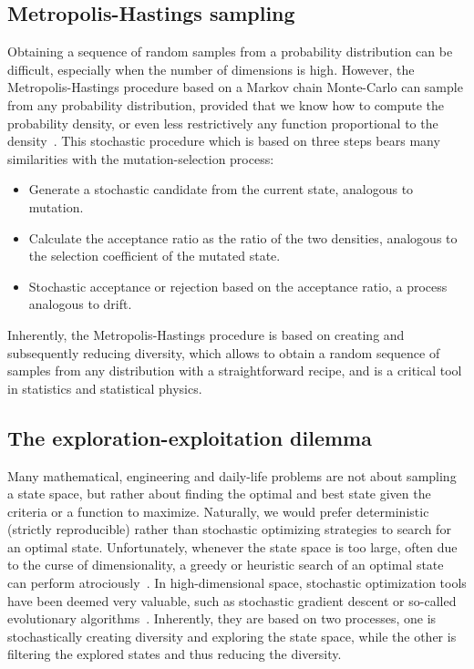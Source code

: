 \subsection{Metropolis-Hastings sampling}
Obtaining a sequence of random samples from a probability distribution can be difficult, especially when the number of dimensions is high.
However, the Metropolis-Hastings procedure based on a Markov chain Monte-Carlo can sample from any probability distribution, provided that we know how to compute the probability density, or even less restrictively any function proportional to the density~\citep{Hastings1970}.
This stochastic procedure which is based on three steps bears many similarities with the mutation-selection process:
\begin{itemize}
    \item Generate a stochastic candidate from the current state, analogous to mutation.
    \item Calculate the acceptance ratio as the ratio of the two densities, analogous to the selection coefficient of the mutated state.
    \item Stochastic acceptance or rejection based on the acceptance ratio, a process analogous to drift.
\end{itemize}
Inherently, the Metropolis-Hastings procedure is based on creating and subsequently reducing diversity, which allows to obtain a random sequence of samples from any distribution with a straightforward recipe, and is a critical
tool in statistics and statistical physics.

\subsection{The exploration-exploitation dilemma}
Many mathematical, engineering and daily-life problems are not about sampling a state space, but rather about finding the optimal and best state given the criteria or a function to maximize.
Naturally, we would prefer deterministic (strictly reproducible) rather than stochastic optimizing strategies to search for an optimal state.
Unfortunately, whenever the state space is too large, often due to the curse of dimensionality, a greedy or heuristic search of an optimal state can perform atrociously~\citep{Bellman1966}.
In high-dimensional space, stochastic optimization tools have been deemed very valuable, such as stochastic gradient descent or so-called evolutionary algorithms~\citep{Russell2010,Vikhar2017}.
Inherently, they are based on two processes, one is stochastically creating diversity and exploring the state space, while the other is filtering the explored states and thus reducing the diversity.

